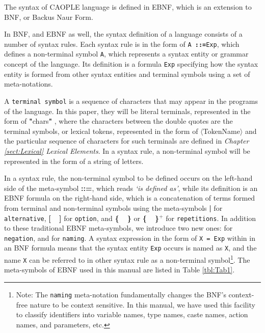 \documentclass[english]{report}
\newcommand{\choice}{\color{red} \textbf{ | } \color{black}}
\newcommand{\defs}{\color{red}\textbf{::=}\color{black}}
\newcommand{\opt}[1]{\color{red} \textbf{[} \color{black} #1 \color{red} \textbf{]} \color{black}}
\newcommand{\tml}[1]{\color{blue}$\langle$#1$\rangle$\color{black}}
\newcommand{\rpt}[1]{\color{red} \textbf{\{} \color{black} #1 \color{red} \textbf{\}} \color{black}}
\newcommand{\rptn}[1]{\color{red} \textbf{\{} \color{black} #1 \color{red}\textbf{\}$^+$} \color{black}}
\newcommand{\lit}[1]{\color{red} \textbf{"}\color{blue}#1\color{red}\textbf{"} \color{black}}
\begin{document}
\setcounter{page}{1}

The syntax of CAOPLE language is defined in EBNF, which is an extension to BNF, or Backus Naur Form. 

In BNF, and EBNF as well, the syntax definition of a language consists of a number of syntax rules. 
Each syntax rule is in the form of \texttt{A \defs  Exp}, which defines a non-terminal symbol \texttt{A}, which represents a syntax entity or grammar concept of the language. Its definition is a formula \texttt{Exp} specifying how the syntax entity is formed from other syntax entities 
and terminal symbols using a set of meta-notations. 

A \texttt{terminal symbol} is a sequence of characters that may appear in the programs of the language. In this paper, they will be literal terminals, represented in the form of \lit{chars}, where the characters between the double quotes are the terminal symbols, or lexical tokens, represented in the form of \tml{TokenName} and the particular sequence of characters for such terminals are defined in \emph{Chapter \ref{sect:Lexical} Lexical Elements}. In a syntax rule, a non-terminal symbol will be represented in the form of a string of letters. 

In a syntax rule, the non-terminal symbol to be defined occurs on the left-hand side of the meta-symbol \defs, which reads \textit{`is defined as'}, while its definition is an EBNF formula on the right-hand side, which is a concatenation of terms formed from terminal and non-terminal symbols using the  meta-symbols  \choice for \texttt{alternative},  \opt{~} for \texttt{option},  and \rpt{~} or \rptn{~} for \texttt{repetitions}.  %
In addition to these traditional EBNF meta-symbols, we introduce two new ones: \texttt{\color{red}{$\sim$}} for \texttt{negation}, and \texttt{\color{red}{=}} for \texttt{naming}. A syntax expression in the form of \texttt{X = Exp} within in an BNF formula means that the syntax entity \texttt{Exp} occurs is named as \texttt{X}, and the name \texttt{X} can be referred to in other syntax rule as a non-terminal symbol\footnote{Note: The \texttt{naming}  meta-notation fundamentally changes the BNF's context-free nature to be context sensitive. In this manual, we have used this facility to classify identifiers into variable names, type names, caste names, action names, and parameters, etc.}. 
The meta-symbols of EBNF used in this manual are listed in Table \ref{tbl:Tab1}. 
\end{document}
